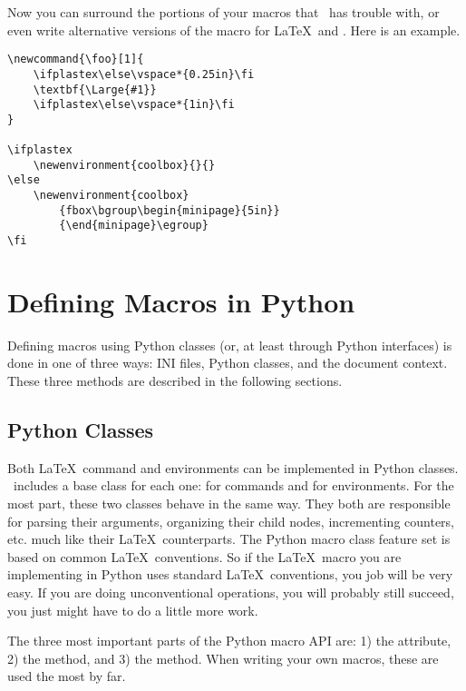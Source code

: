 Now you can surround the portions of your macros that \plasTeX\ has 
trouble with, or even write alternative versions of the macro for 
\LaTeX\ and \plasTeX.  Here is an example.
\begin{verbatim}
\newcommand{\foo}[1]{
    \ifplastex\else\vspace*{0.25in}\fi
    \textbf{\Large{#1}}
    \ifplastex\else\vspace*{1in}\fi
}

\ifplastex
    \newenvironment{coolbox}{}{}
\else
    \newenvironment{coolbox}
        {fbox\bgroup\begin{minipage}{5in}}
        {\end{minipage}\egroup}
\fi
\end{verbatim}


\section{Defining Macros in Python}

Defining macros using Python classes (or, at least through Python interfaces)
is done in one of three ways: INI files, Python classes, and the document
context.  These three methods are described in the following sections.


\subsection{Python Classes\label{sec:macroclasses}}

Both \LaTeX\ command and environments can be implemented in Python
classes.  \plasTeX\ includes a base class for each one: 
for commands and  for environments.  For the most
part, these two classes behave in the same way.  They both are 
responsible for parsing their arguments, organizing their child nodes,
incrementing counters, etc. much like their \LaTeX\ counterparts.
The Python macro class feature set is based on common \LaTeX\ 
conventions.  So if the \LaTeX\ macro you are implementing in Python
uses standard \LaTeX\ conventions, you job will be very easy.  If you
are doing unconventional operations, you will probably still succeed,
you just might have to do a little more work.

The three most important parts of the Python macro API are: 1) the 
\member{args} attribute, 2) the \method{invoke} method, and 3) the
\member{digest} method.  When writing your own macros, these are
used the most by far.

